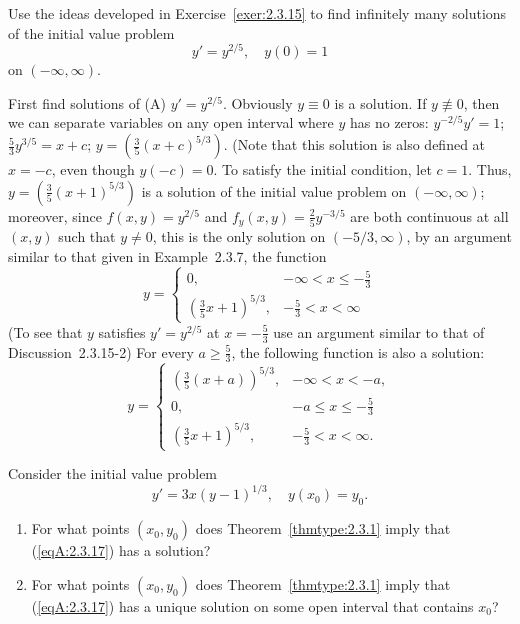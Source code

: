 \documentclass{ximera}
\begin{document}
\begin{problem}\label{exer:2.3.16}
Use the ideas developed in Exercise~\ref{exer:2.3.15} to find
infinitely many solutions of the initial value problem
$$
y'=y^{2/5}, \quad y(0)=1
$$
on $(-\infty,\infty)$.



\begin{solution}
    First find solutions of (A) $y'=y^{2/5}$. Obviously $y\equiv0$ is a
solution. If $y\not\equiv0$, then we can separate variables on any
open interval where $y$ has no zeros: $y^{-2/5}y'=1$;\;
$\frac{5}{3}y^{3/5}=x+c$;\;
$y=\left(\frac{3}{5}(x+c)^{5/3}\right)$. (Note that this solution
is also defined  at $x=-c$, even though  $y(-c)=0$. To satisfy the
initial condition, let $c=1$. Thus,
$y=\left(\frac{3}{5}(x+1)^{5/3}\right)$ is a solution of the
initial value problem on $(-\infty,\infty)$; moreover,
since $f(x,y)=y^{2/5}$ and $f_y(x,y)=\frac{2}{5}y^{-3/5}$
are both continuous  at all $(x,y)$ such that $y\neq 0$,
this is the only
solution on $(-5/3,\infty)$, by an argument similar to that given in
Example~2.3.7, the function
$$
y =
\left\{
\begin{array}{cl}
0, &  -\infty< x \le -\frac{5}{ 3} \\
\left(\frac{3}{ 5}x + 1\right)^{5/3}, & -\frac{5}{3} < x < \infty
\end{array}\right.
$$
(To see that $y$ satisfies $y'=y^{2/5}$  at $x=-\frac{5}{3}$
use an argument similar to that of
Discussion~2.3.15-2)
For every $a \geq \frac{5}{ 3}$, the following function is also a
solution:
$$
y =
\left\{
\begin{array}{cl}
\left( \frac{3}{ 5} (x+a) \right)^{5/3}, & - \infty < x < -a, \\
0, &  -a \le x \le -\frac{5}{ 3} \\
\left(\frac{3}{ 5}x + 1\right)^{5/3}, & -\frac{5}{3} < x < \infty.
\end{array}\right.
$$
\end{solution}
\end{problem}

\begin{problem}\label{exer:2.3.17}
 Consider the initial value problem
\begin{equation}\label{eqA:2.3.17}
 y' = 3x(y-1)^{1/3}, \quad y(x_0) = y_0.
\end{equation}

\begin{enumerate}
\item %
For what points $(x_0,y_0)$ does Theorem~\ref{thmtype:2.3.1} imply that
(\ref{eqA:2.3.17}) has a solution?
\item %
 For what points $(x_0,y_0)$ does Theorem~\ref{thmtype:2.3.1} imply that
(\ref{eqA:2.3.17}) has a  unique solution on some open interval
that contains  $x_0$?
\end{enumerate}
\end{problem}
\end{document}
